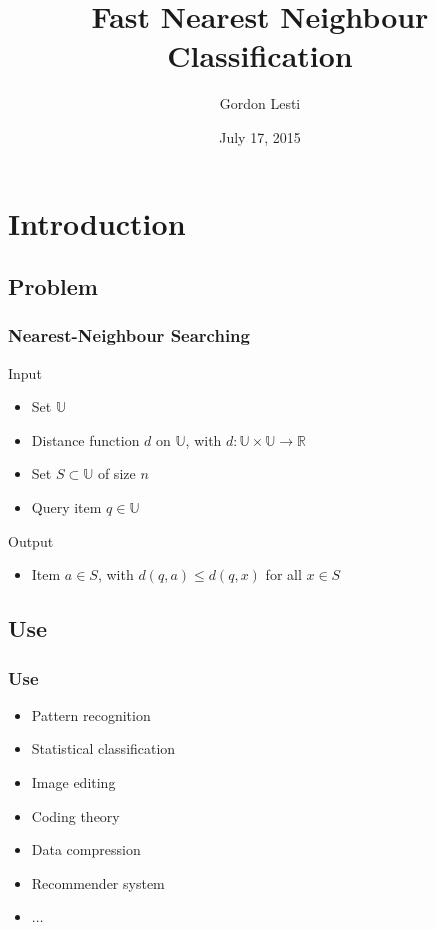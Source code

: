 \documentclass[handout]{beamer}
\begin{document}
\title{Fast Nearest Neighbour Classification}
\author{Gordon Lesti}
\date{July 17, 2015}

\frame{\titlepage}

\section{Introduction}

\subsection{Problem}
\begin{frame}
 \frametitle{Nearest-Neighbour Searching}
 \begin{block}{Input}
   \begin{itemize}
    \item Set $\mathbb{U}$
    \pause
    \item Distance function $d$ on $\mathbb{U}$, with $d: \mathbb{U} \times \mathbb{U} \to \mathbb{R}$
    \pause
    \item Set $S \subset \mathbb{U}$ of size $n$
    \pause
    \item Query item $q \in \mathbb{U}$
  \end{itemize}
 \end{block}
 \pause
 \begin{block}{Output}
    \begin{itemize}
     \item Item $a \in S$, with $d(q, a) \le d(q, x)$ for all $x \in S$
    \end{itemize}
 \end{block}
\end{frame}

\subsection{Use}
\begin{frame}
 \frametitle{Use}
 \begin{itemize}
 \item Pattern recognition
 \item Statistical classification
 \item Image editing
 \item Coding theory
 \item Data compression
 \item Recommender system
 \item $\dots$
\end{itemize}
\end{frame}
\end{document}
